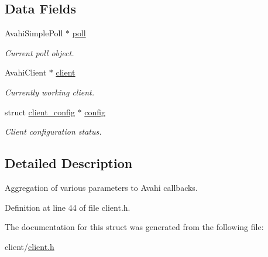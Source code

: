 \subsection*{Data Fields}
\begin{DoxyCompactItemize}
\item 
\hypertarget{structavahi__callback__params_a0a7dd205aeb2879ac6e618c6da3b7477}{
AvahiSimplePoll $\ast$ \hyperlink{structavahi__callback__params_a0a7dd205aeb2879ac6e618c6da3b7477}{poll}}
\label{structavahi__callback__params_a0a7dd205aeb2879ac6e618c6da3b7477}

\begin{DoxyCompactList}\small\item\em Current poll object. \item\end{DoxyCompactList}\item 
\hypertarget{structavahi__callback__params_aa13ccffa23fd1cfe24c33471fbc1f57f}{
AvahiClient $\ast$ \hyperlink{structavahi__callback__params_aa13ccffa23fd1cfe24c33471fbc1f57f}{client}}
\label{structavahi__callback__params_aa13ccffa23fd1cfe24c33471fbc1f57f}

\begin{DoxyCompactList}\small\item\em Currently working client. \item\end{DoxyCompactList}\item 
\hypertarget{structavahi__callback__params_abb59d3961e7409275a1cefae9915dc23}{
struct \hyperlink{structclient__config}{client\_\-config} $\ast$ \hyperlink{structavahi__callback__params_abb59d3961e7409275a1cefae9915dc23}{config}}
\label{structavahi__callback__params_abb59d3961e7409275a1cefae9915dc23}

\begin{DoxyCompactList}\small\item\em Client configuration status. \item\end{DoxyCompactList}\end{DoxyCompactItemize}


\subsection{Detailed Description}
Aggregation of various parameters to Avahi callbacks. 

Definition at line 44 of file client.h.



The documentation for this struct was generated from the following file:\begin{DoxyCompactItemize}
\item 
client/\hyperlink{client_8h}{client.h}\end{DoxyCompactItemize}
